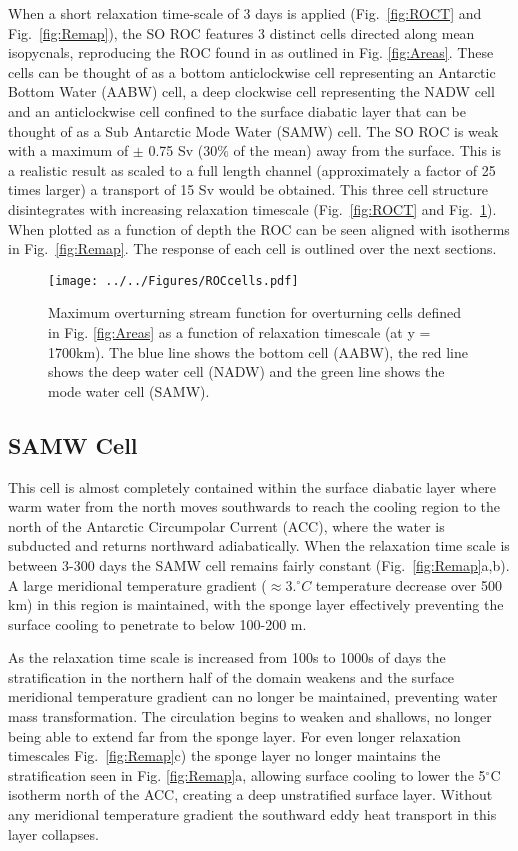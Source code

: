 When a short relaxation time-scale of 3 days is applied (Fig.~\ref{fig:ROCT} and Fig.~\ref{fig:Remap}), the SO ROC features 3 distinct cells directed along mean isopycnals, reproducing the ROC found in \cite{Abernathey2011} as outlined in Fig. \ref{fig:Areas}. These cells can be thought of as a bottom anticlockwise cell representing an Antarctic Bottom Water (AABW) cell, a deep clockwise cell representing the  NADW cell and an anticlockwise cell confined to the surface diabatic layer that can be thought of as a Sub Antarctic Mode Water (SAMW) cell. The SO ROC is weak with a maximum of $\pm$ 0.75 Sv (30$\%$ of the mean) away from the surface. This is a realistic result as scaled to a full length channel (approximately a factor of 25 times larger) a transport of 15 Sv would be obtained. This three cell structure disintegrates with increasing relaxation timescale (Fig.~\ref{fig:ROCT} and Fig.~\ref{fig:ROCells}). When plotted as a function of depth the ROC can be seen aligned with isotherms in Fig.~\ref{fig:Remap}. The response of each cell is outlined over the next sections.
\begin{figure}
\noindent \texttt{[image: ../../Figures/ROCcells.pdf]} 
\caption{Maximum overturning stream function for overturning cells defined in Fig. \ref{fig:Areas} as a function of relaxation timescale (at y = 1700km). The blue line shows the bottom cell (AABW), the red line shows the deep water cell (NADW) and the green line shows the mode water cell (SAMW).   }
\label{fig:ROCells}
\end{figure}
\subsection{SAMW Cell}
This cell is almost completely contained within the surface diabatic layer where warm water from the north moves southwards to reach the cooling region to the north of the Antarctic Circumpolar Current (ACC), where the water is subducted and returns northward adiabatically. When the relaxation time scale is between 3-300 days the SAMW cell remains fairly constant (Fig.~\ref{fig:Remap}a,b). A large meridional temperature gradient ($\approx 3.^{\circ} C$ temperature decrease over 500 km) in this region is maintained, with the sponge layer effectively preventing the surface cooling to penetrate to below 100-200 m.

As the relaxation time scale is increased from 100s to 1000s of days the stratification in the northern half of the domain weakens and the surface meridional temperature gradient can no longer be maintained, preventing water mass transformation. The circulation begins to weaken and shallows, no longer being able to extend far from the sponge layer. For even longer relaxation timescales Fig.~\ref{fig:Remap}c) the sponge layer no longer maintains the stratification seen in Fig. \ref{fig:Remap}a, allowing surface cooling to lower the 5$^{\circ}$C isotherm north of the ACC, creating a deep unstratified surface layer. Without any meridional temperature gradient the southward eddy heat transport in this layer collapses. 

